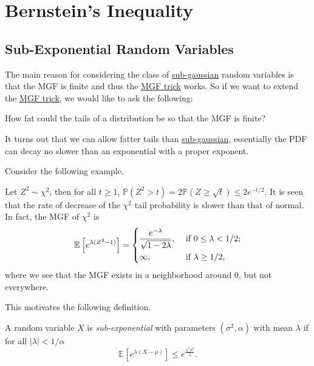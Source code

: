\section{Bernstein's Inequality}
\subsection{Sub-Exponential Random Variables}
The main reason for considering the class of \hyperref[def:sub-gaussian]{sub-gaussian} random variables is that the MGF is finite and thus the \hyperref[lma:MGF-trick]{MGF trick} works. So if we want to extend the \hyperref[lma:MGF-trick]{MGF trick}, we would like to ask the following:

\begin{problem*}
  How fat could the tails of a distribution be so that the MGF is finite?
\end{problem*}
\begin{answer}
  It turns out that we can allow fatter tails than \hyperref[def:sub-gaussian]{sub-gaussian}, essentially the PDF can decay no slower than an exponential with a proper exponent.
\end{answer}

Consider the following example.

\begin{eg}
  Let \(Z^2 \sim \chi ^2\), then for all \(t \geq 1\), \(\mathbb{P} (Z^2 > t) = 2\mathbb{P} (Z \geq \sqrt{t} ) \leq 2 e^{-t / 2}\). It is seen that the rate of decrease of the \(\chi ^2\) tail probability is slower than that of normal. In fact, the MGF of \(\chi ^{2} \) is
  \[
    \mathbb{E}_{}\left[e^{\lambda (Z^2 - 1)} \right] =
    \begin{dcases}
      \frac{e^{-\lambda }}{\sqrt{1 - 2 \lambda } }, & \text{ if } 0 \leq \lambda < 1 / 2 ; \\
      \infty ,                                      & \text{ if } \lambda  \geq 1 / 2 ,
    \end{dcases}
  \]
  where we see that the MGF exists in a neighborhood around \(0\), but not everywhere.
\end{eg}

This motivates the following definition.

\begin{definition}\label{def:sub-exponential}
  A random variable \(X\) is \emph{sub-exponential} with parameters \((\sigma ^{2} , \alpha )\) with mean \(\lambda \) if for all \(\vert \lambda  \vert < 1 / \alpha \)
  \[
    \mathbb{E}_{}\left[e^{\lambda (X - \mu )} \right] \leq e^{\frac{\lambda ^{2} \sigma ^{2} }{2}}.
  \]
\end{definition}

